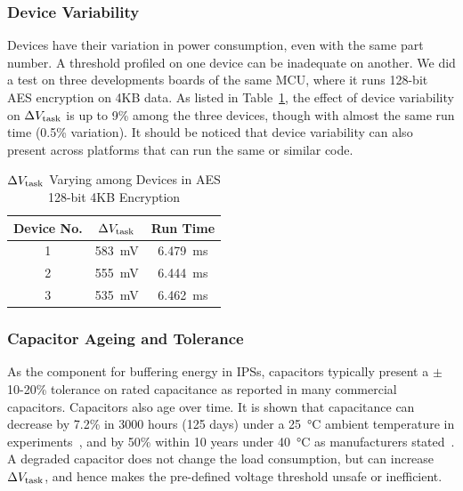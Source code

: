 \subsubsection{Device Variability}

Devices have their variation in power consumption, even with the same part number. 
A threshold profiled on one device can be inadequate on another. 
We did a test on three developments boards of the same MCU, where it runs 128-bit AES encryption on 4KB data. 
As listed in Table~\ref{tab:device}, the effect of device variability on $\Delta V_{\text{task}}$ is up to 9\% among the three devices, though with almost the same run time (0.5\% variation). 
It should be noticed that device variability can also present across platforms that can run the same or similar code. 

\begin{table}
    \renewcommand{\arraystretch}{1.2}
    \centering
    \caption{$\Delta V_{\text{task}}$ Varying among Devices in AES 128-bit 4KB Encryption}
    \label{tab:device}
    \begin{tabular}{|c|c|c|}
    \hline
    \textbf{Device No.} & \textbf{$\Delta V_{\text{task}}$} & \textbf{Run Time} \\
    \hline
    1 & \SI{583}{\milli\volt} & \SI{6.479}{\milli\second} \\
    2 & \SI{555}{\milli\volt} & \SI{6.444}{\milli\second} \\
    3 & \SI{535}{\milli\volt} & \SI{6.462}{\milli\second} \\
    \hline
    \end{tabular}
\end{table}

\subsubsection{Capacitor Ageing and Tolerance}
\label{subsubsec:capacitance_variability}

As the component for buffering energy in IPSs, capacitors typically present a $\pm$10-20\% tolerance on rated capacitance as reported in many commercial capacitors. 
Capacitors also age over time. 
It is shown that capacitance can decrease by 7.2\% in 3000 hours (125 days) under a \SI{25}{\celsius} ambient temperature in experiments~\cite{kulkarni2010experimental}, and by 50\% within 10 years under \SI{40}{\celsius} as manufacturers stated~\cite{vishaycapacitor}.
A degraded capacitor does not change the load consumption, but can increase $\Delta V_{\text{task}}$, and hence makes the pre-defined voltage threshold unsafe or inefficient. 


